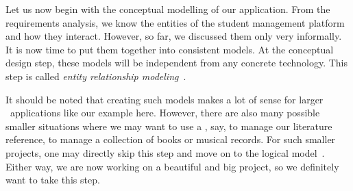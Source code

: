 %
\label{sec:conceptualSchemaDesign}%
%
Let us now begin with the conceptual modelling of our application.
From the requirements analysis, we know the entities of the student management platform and how they interact.
However, so far, we discussed them only very informally.
It is now time to put them together into consistent models.
At the conceptual design step, these models will be independent from any concrete technology.
This step is called \emph{entity relationship modeling}~\cite{G2011EW2ITDS:CMUTERM,SS2005EIDDDFDB:CDDRAAML,SS2005EIDDDFDB:CDDICAMP,V1999C5DMS:CDUTERM,B1990CMERMO}.

It should be noted that creating such models makes a lot of sense for larger \db\ applications like our example here.
However, there are also many possible smaller situations where we may want to use a \db, say, to manage our literature reference, to manage a collection of books or musical records.
For such smaller projects, one may directly skip this step and move on to the logical model~\cite{S2024D:CDMERDE}.
Either way, we are now working on a beautiful and big project, so we definitely want to take this step.
%
%
%
%
%
%
%
%
%
%
\endhsection%
%
